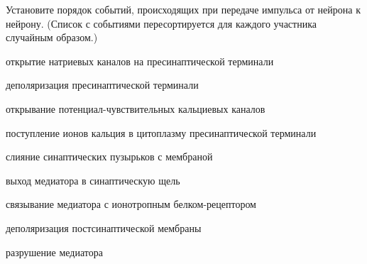
Установите порядок событий, происходящих при передаче импульса от нейрона к нейрону. (Список с событиями пересортируется для каждого участника случайным образом.)

\begin{itemsize}
    \item открытие натриевых каналов на пресинаптической терминали
    \item деполяризация пресинаптической терминали
    \item открывание потенциал-чувствительных кальциевых каналов
    \item поступление ионов кальция в цитоплазму пресинаптической терминали
    \item слияние синаптических пузырьков с мембраной
    \item выход медиатора в синаптическую щель
    \item связывание медиатора с ионотропным белком-рецептором
    \item деполяризация постсинаптической мембраны
    \item разрушение медиатора
\end{itemsize}
